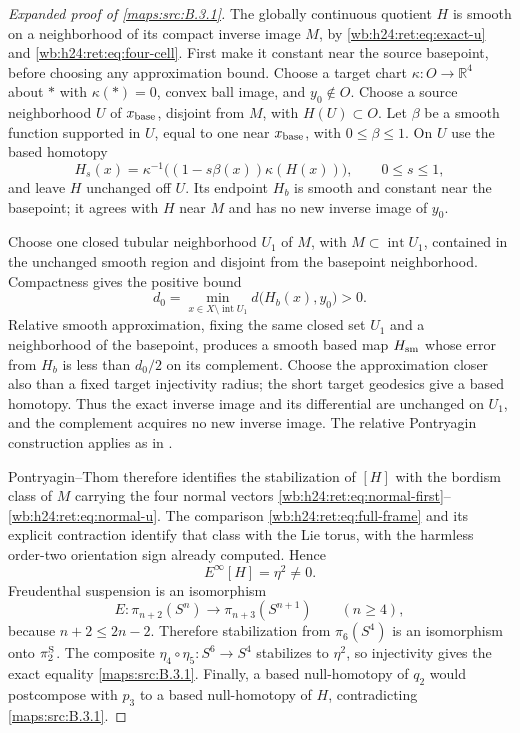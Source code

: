 \begin{proof}[Expanded proof of \cref{maps:src:B.3.1}]
The globally continuous quotient \(H\) is smooth on a neighborhood
of its compact inverse image \(M\), by
\eqref{wb:h24:ret:eq:exact-u} and \eqref{wb:h24:ret:eq:four-cell}. First make it constant
near the source basepoint, before choosing any approximation bound.
Choose a target chart \(\kappa:O\to\mathbb R^4\) about \(*\) with
\(\kappa(*)=0\), convex ball image, and \(y_0\notin O\).
Choose a source neighborhood \(U\) of \(x_{\rm base}\), disjoint
from \(M\), with \(H(U)\subset O\). Let \(\beta\) be a smooth
function supported in \(U\), equal to one near \(x_{\rm base}\),
with \(0\leq\beta\leq1\). On \(U\) use the based homotopy
\[
 H_s(x)=\kappa^{-1}\bigl((1-s\beta(x))\kappa(H(x))\bigr),
 \qquad 0\leq s\leq1,
\]
and leave \(H\) unchanged off \(U\). Its endpoint \(H_b\) is
smooth and constant near the basepoint; it agrees with \(H\)
near \(M\) and has no new inverse image of \(y_0\).

Choose one closed tubular neighborhood \(U_1\) of \(M\), with
\(M\subset\operatorname{int}U_1\), contained in the unchanged
smooth region and disjoint from the basepoint neighborhood.
Compactness gives the positive bound
\[
 d_0=\min_{x\in X\setminus\operatorname{int}U_1}
             d\bigl(H_b(x),y_0\bigr)>0.
\]
Relative smooth approximation, fixing the same closed set \(U_1\)
and a neighborhood of the basepoint, produces a smooth based map
\(H_{\rm sm}\) whose error from \(H_b\) is less than \(d_0/2\)
on its complement. Choose the approximation closer also than a
fixed target injectivity radius; the short target geodesics give a
based homotopy. Thus the exact inverse image and its differential
are unchanged on \(U_1\), and the complement acquires no new
inverse image. The relative Pontryagin construction applies as in
\cite[\S7, Theorem B and Lemma 4, pp.~43, 48--50]{CuspNullMilnor1965}.

Pontryagin--Thom therefore identifies the stabilization of
\([H]\) with the bordism class of \(M\) carrying the four normal
vectors \eqref{wb:h24:ret:eq:normal-first}--\eqref{wb:h24:ret:eq:normal-u}.  The comparison
\eqref{wb:h24:ret:eq:full-frame} and its explicit contraction identify that
class with the Lie torus, with the harmless order-two orientation
sign already computed.  Hence
\[
 E^\infty[H]=\eta^2\ne0.
\]
Freudenthal suspension is an isomorphism
\[
 E:\pi_{n+2}(S^n)\longrightarrow\pi_{n+3}(S^{n+1})
 \qquad(n\geq4),
\]
because \(n+2\leq2n-2\).  Therefore stabilization from
\(\pi_6(S^4)\) is an isomorphism onto \(\pi_2^{\rm S}\).
The composite \(\eta_4\circ\eta_5:S^6\to S^4\) stabilizes to
\(\eta^2\), so injectivity gives the exact equality
\cref{maps:src:B.3.1}.  Finally, a based null-homotopy of \(q_2\)
would postcompose with \(p_3\) to a based null-homotopy of \(H\),
contradicting \cref{maps:src:B.3.1}.
\end{proof}


